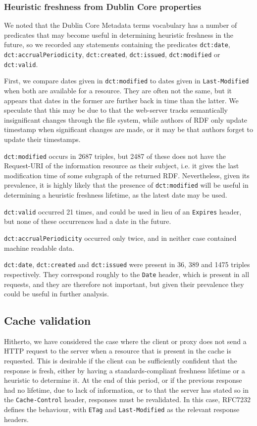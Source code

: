 \documentclass{llncs}
\newcommand{\rdfterm}[1]{\texttt{#1}}
\newcommand{\httph}[1]{\texttt{#1}}
\begin{document}
\subsubsection{Heuristic freshness from Dublin Core properties}

We noted that the Dublin Core Metadata terms vocabulary has a number
of predicates that may become useful in determining heuristic
freshness in the future, so we recorded any statements containing the
predicates \rdfterm{dct:date}, \rdfterm{dct:accrualPeriodicity},
\rdfterm{dct:created}, \rdfterm{dct:issued}, \rdfterm{dct:modified} or
\rdfterm{dct:valid}.

First, we compare dates given in \rdfterm{dct:modified} to dates given
in \httph{Last-Modified} when both are available for a resource. They
are often not the same, but it appears that dates in the former are
further back in time than the latter. We speculate that this may be
due to that the web-server tracks semantically insignificant changes
through the file system, while authors of RDF only update timestamp
when significant changes are made, or it may be that authors forget to
update their timestamps.

\rdfterm{dct:modified} occurs in 2687 triples, but 2487 of these does
not have the Request-URI of the information resource as their subject,
i.e. it gives the last modification time of some subgraph of the
returned RDF. Nevertheless, given its prevalence, it is highly likely
that the presence of \rdfterm{dct:modified} will be useful in
determining a heuristic freshness lifetime, as the latest date may be
used.

\rdfterm{dct:valid} occurred 21 times, and could be used in lieu of an
\httph{Expires} header, but none of these occurrences had a date in the
future. 

\rdfterm{dct:accrualPeriodicity} occurred only twice, and in neither
case contained machine readable data.

\rdfterm{dct:date}, \rdfterm{dct:created} and \rdfterm{dct:issued}
were present in 36, 389 and 1475 triples respectively. They correspond
roughly to the \httph{Date} header, which is present in all requests,
and they are therefore not important, but given their prevalence they
could be useful in further analysis.

\subsection{Cache validation}

Hitherto, we have considered the case where the client or proxy does
not send a HTTP request to the server when a resource that is present
in the cache is requested. This is desirable if the client can be
sufficiently confident that the response is fresh, either by having a
standards-compliant freshness lifetime or a heuristic to determine
it. At the end of this period, or if the previous response had no
lifetime, due to lack of information, or to that the server has stated
so in the \httph{Cache-Control} header, responses must be
revalidated. In this case, RFC7232 defines the behaviour, with
\httph{ETag} and \httph{Last-Modified} as the relevant response
headers.
\end{document}
